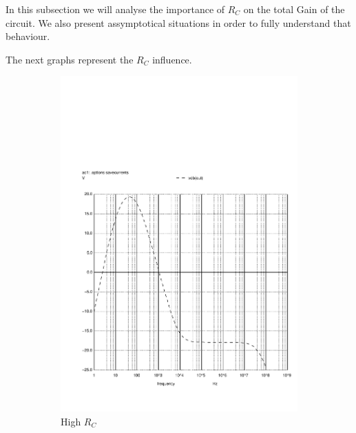 In this subsection we will analyse the importance of $R_C$ on the total Gain of the circuit.
We also present assymptotical situations in order to fully understand that behaviour.

The next graphs represent the $R_C$ influence.

\begin{figure}[H] 
\centering
\begin{subfigure}{0.4\textwidth}
\includegraphics[width=\textwidth]{rchigh.pdf}
\caption{High $R_C$}
\label{highrc}
\end{subfigure}
\begin{subfigure}{0.3\textwidth}

\end{subfigure}
\end{figure}
